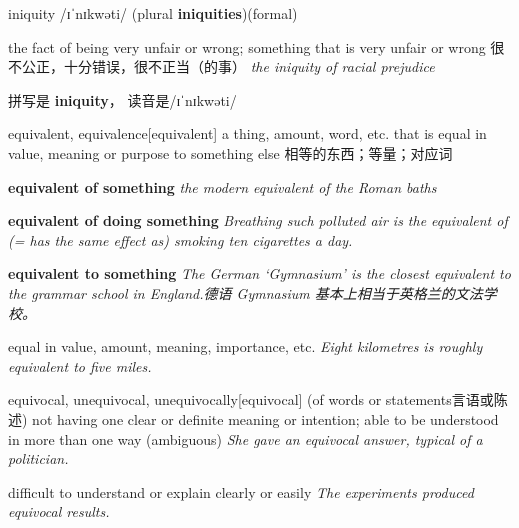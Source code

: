 \begin{DefWord}{iniquity}
    /ɪˈnɪkwəti/ (plural \textbf{iniquities})(formal)

the fact of being very unfair or wrong; something that is very unfair or wrong 很不公正，十分错误，很不正当（的事）
\textit{the iniquity of racial prejudice}

    \begin{remark}
        拼写是 \textbf{iniquity}， 读音是/ɪˈnɪkwəti/
    \end{remark}
\end{DefWord}

\begin{DefWord}{equivalent, equivalence}[equivalent]
    a thing, amount, word, etc. that is equal in value, meaning or purpose to something else 相等的东西；等量；对应词

    \textbf{equivalent of something} \textit{the modern equivalent of the Roman baths}

    \textbf{equivalent of doing something} \textit{Breathing such polluted air is the equivalent of (= has the same effect as) smoking ten cigarettes a day.}

    \textbf{equivalent to something} \textit{The German ‘Gymnasium’ is the closest equivalent to the grammar school in England.德语 Gymnasium 基本上相当于英格兰的文法学校。}

    equal in value, amount, meaning, importance, etc.
    \textit{Eight kilometres is roughly equivalent to five miles.}
\end{DefWord}

\begin{DefWord}{equivocal, unequivocal, unequivocally}[equivocal]
    (of words or statements言语或陈述) not having one clear or definite meaning or intention; able to be understood in more than one way (ambiguous)
    \textit{She gave an equivocal answer, typical of a politician.}

    difficult to understand or explain clearly or easily
    \textit{The experiments produced equivocal results.}
\end{DefWord}